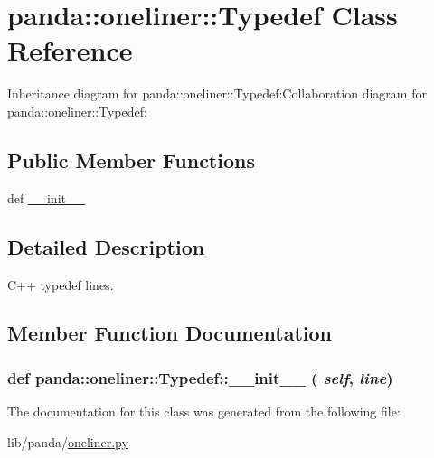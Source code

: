 \hypertarget{classpanda_1_1oneliner_1_1Typedef}{
\section{panda::oneliner::Typedef Class Reference}
\label{classpanda_1_1oneliner_1_1Typedef}
}
Inheritance diagram for panda::oneliner::Typedef:Collaboration diagram for panda::oneliner::Typedef:\subsection*{Public Member Functions}
\begin{DoxyCompactItemize}
\item 
def \hyperlink{classpanda_1_1oneliner_1_1Typedef_a3b34b65dc9c53aabd7fea36cfe57075e}{\_\-\_\-init\_\-\_\-}
\end{DoxyCompactItemize}


\subsection{Detailed Description}
\begin{DoxyVerb}
C++ typedef lines.
\end{DoxyVerb}
 

\subsection{Member Function Documentation}
\hypertarget{classpanda_1_1oneliner_1_1Typedef_a3b34b65dc9c53aabd7fea36cfe57075e}{
\subsubsection[{\_\-\_\-init\_\-\_\-}]{\setlength{\rightskip}{0pt plus 5cm}def panda::oneliner::Typedef::\_\-\_\-init\_\-\_\- ( {\em self}, \/   {\em line})}}
\label{classpanda_1_1oneliner_1_1Typedef_a3b34b65dc9c53aabd7fea36cfe57075e}


The documentation for this class was generated from the following file:\begin{DoxyCompactItemize}
\item 
lib/panda/\hyperlink{oneliner_8py}{oneliner.py}\end{DoxyCompactItemize}
